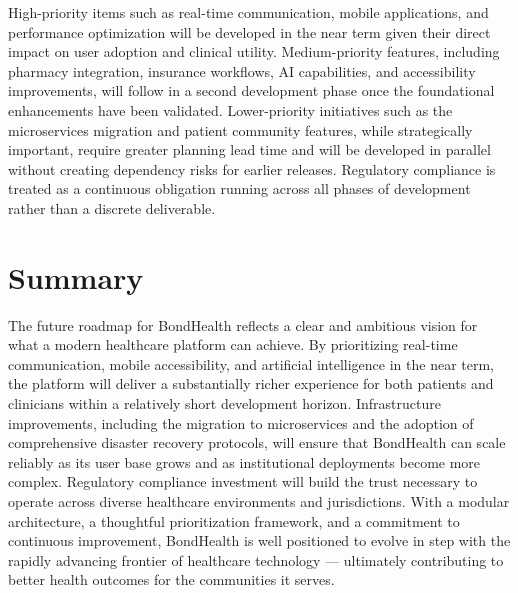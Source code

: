 \noindent High-priority items such as real-time communication, mobile applications, and performance optimization will be developed in the near term given their direct impact on user adoption and clinical utility. Medium-priority features, including pharmacy integration, insurance workflows, AI capabilities, and accessibility improvements, will follow in a second development phase once the foundational enhancements have been validated. Lower-priority initiatives such as the microservices migration and patient community features, while strategically important, require greater planning lead time and will be developed in parallel without creating dependency risks for earlier releases. Regulatory compliance is treated as a continuous obligation running across all phases of development rather than a discrete deliverable.

\section{Summary}

\noindent The future roadmap for BondHealth reflects a clear and ambitious vision for what a modern healthcare platform can achieve. By prioritizing real-time communication, mobile accessibility, and artificial intelligence in the near term, the platform will deliver a substantially richer experience for both patients and clinicians within a relatively short development horizon. Infrastructure improvements, including the migration to microservices and the adoption of comprehensive disaster recovery protocols, will ensure that BondHealth can scale reliably as its user base grows and as institutional deployments become more complex. Regulatory compliance investment will build the trust necessary to operate across diverse healthcare environments and jurisdictions. With a modular architecture, a thoughtful prioritization framework, and a commitment to continuous improvement, BondHealth is well positioned to evolve in step with the rapidly advancing frontier of healthcare technology --- ultimately contributing to better health outcomes for the communities it serves.